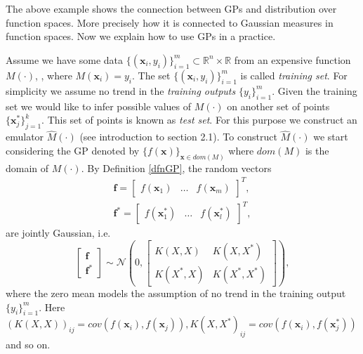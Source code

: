 \documentclass[12pt]{book}
\newcommand{\x}{\textbf{x}}
\begin{document}
The above example shows the connection between GPs and distribution over function spaces. More
precisely how it is connected to Gaussian measures in function spaces. Now we 
explain how to use GPs in a practice.

Assume  we have some  data $\{(\textbf{x}_{i},y_{i})\}_{i=1}^{m}\subset\mathbb{R}^{n}\times\mathbb{R}$ 
 from an expensive function  $M(\cdot)$, 
, where $M(\textbf{x}_{i})=y_{i}$. The set $\{(\textbf{x}_{i},y_{i})\}_{i=1}^{m}$ is called
\textit{training set}. For
simplicity we assume no trend in the \textit{training outputs} $\{y_{i}\}_{i=1}^{m}$. Given the training set
we would like to infer  possible values of $M(\cdot)$ on another set of points 
$\{\textbf{x}_{j}^{*}\}_{j=1}^{k}$. This set of points  is known as \textit{test set}.
For this purpose we construct an emulator $\widehat{M}(\cdot)$ (see introduction to section 2.1).
To construct $\widehat{M}(\cdot)$  we  start considering the GP denoted by $\{f(\textbf{x})\}_{\x\in dom(M)}$
 where $dom(M)$ 
is  the domain of $M(\cdot)$.
 By
Definition \ref{dfnGP}, the random vectors
\begin{eqnarray*}
\textbf{f}=\begin{bmatrix}f(\textbf{x}_{1}) & \ldots & f(\textbf{x}_{m}) \end{bmatrix}^{T}, \\
\textbf{f}^{*}=\begin{bmatrix}f(\textbf{x}_{1}^{*}) & \ldots & f(\textbf{x}_{l}^{*}) \end{bmatrix}^{T},
\end{eqnarray*}
are  jointly Gaussian, i.e. 
\begin{equation}\label{eqnconditional}
\begin{bmatrix}
\textbf{f} \\
\textbf{f}^{*}
\end{bmatrix}\sim\mathscr{N}\left(0,\begin{bmatrix} K(X,X) & K(X,X^{*}) \\
						    K(X^{*},X) & K(X^{*},X^{*}) \end{bmatrix}
\right),
\end{equation}	
where the zero mean models the assumption of no trend in the training output $\{y_{i}\}_{i=1}^{m}$.
Here
$(K(X,X))_{ij}=cov(f(\x_{i}),f(\x_{j})), K(X,X^{*})_{ij}=cov(f(\textbf{x}_{i}),f(\x_{j}^{*}))$ and so on.
\end{document}

